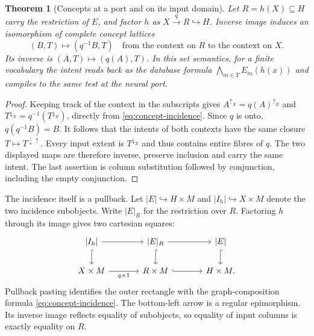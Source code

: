 \documentclass[11pt,a4paper]{article}
\newtheorem{theorem}{Theorem}[section]
\theoremstyle{definition}
\theoremstyle{remark}\newaliascnt{remark}{theorem}
\numberwithin{equation}{section}
\begin{document}
\begin{theorem}[Concepts at a port and on its input domain]\label{thm:reachable-concepts}
Let $R=h(X)\subseteq H$ carry the restriction of $E$, and factor $h$ as $X\xrightarrow{q}R\hookrightarrow H$. Inverse image induces an isomorphism of complete concept lattices
\[
  (B,T)\longmapsto(q^{-1}B,T)
  \quad\text{from the context on $R$ to the context on $X$.}
\]
Its inverse is $(A,T)\mapsto(q(A),T)$. In this set semantics, for a finite vocabulary the intent reads back as the database formula $\bigwedge_{m\in T}E_m(h(x))$ and compiles to the same test at the neural port.
\end{theorem}
\begin{proof}
Keeping track of the context in the subscripts gives
$A^{\uparrow_X}=q(A)^{\uparrow_R}$ and
$T^{\downarrow_X}=q^{-1}(T^{\downarrow_R})$, directly from \eqref{eq:concept-incidence}. Since $q$ is onto, $q(q^{-1}B)=B$. It follows that the intents of both contexts have the same closure $T\mapsto T^{\downarrow\uparrow}$. Every input extent is $T^{\downarrow_X}$ and thus contains entire fibres of $q$. The two displayed maps are therefore inverse, preserve inclusion and carry the same intent. The last assertion is column substitution followed by conjunction, including the empty conjunction.
\end{proof}
The incidence itself is a pullback. Let \(\lvert E\rvert\hookrightarrow H\times M\) and \(\lvert I_h\rvert\hookrightarrow X\times M\) denote the two incidence subobjects. Write \(\lvert E\rvert_R\) for the restriction over \(R\). Factoring \(h\) through its image gives two cartesian squares:
\[
\begin{tikzcd}[column sep=large]
 \lvert I_h\rvert\arrow[r]\arrow[d,hook]&\lvert E\rvert_{R}\arrow[r]\arrow[d,hook]&\lvert E\rvert\arrow[d,hook]\\
 X\times M\arrow[r,"q\times 1"']&R\times M\arrow[r,hook]&H\times M .
\end{tikzcd}
\]
Pullback pasting identifies the outer rectangle with the graph-composition formula \eqref{eq:concept-incidence}. The bottom-left arrow is a regular epimorphism. Its inverse image reflects equality of subobjects, so equality of input columns is exactly equality on \(R\).
\end{document}
